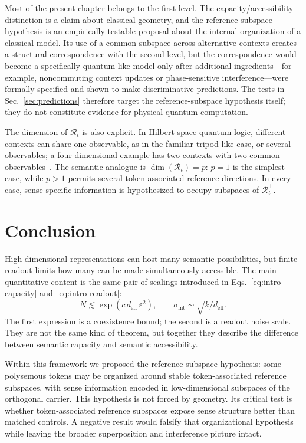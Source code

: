 \documentclass[
  aps,
  reprint,
  superscriptaddress,
  floatfix,
  nofootinbib,
  longbibliography
]{revtex4-2}
\newcommand{\deff}{d_{\mathrm{eff}}}
\newcommand{\sint}{\sigma_{\mathrm{int}}}
\begin{document}
Most of the present chapter belongs to the first level.  The
capacity/accessibility distinction is a claim about classical geometry, and
the reference-subspace hypothesis is an empirically testable proposal about
the internal organization of a classical model. Its use of a common
subspace across alternative contexts creates a structural correspondence with the second
level, but the correspondence would become a specifically quantum-like
model only after additional ingredients---for example, noncommuting context
updates or phase-sensitive interference---were formally specified and shown
to make discriminative predictions.  The tests in
Sec.~\ref{sec:predictions} therefore target the reference-subspace hypothesis itself; they
do not constitute evidence for physical quantum computation.

The dimension of $\mathcal R_t$ is also explicit. In Hilbert-space quantum
logic, different contexts can share one observable, as in the familiar
tripod-like case, or several observables; a four-dimensional example has
two contexts with two common observables~\cite{svozil:040102}. The semantic
analogue is $\dim(\mathcal R_t)=p$: $p=1$ is the simplest case, while
$p>1$ permits several token-associated reference directions. In every case,
sense-specific information is hypothesized to occupy subspaces of
$\mathcal R_t^\perp$.

\section{Conclusion}
\label{sec:conclusion}

High-dimensional representations can host many semantic possibilities,
but finite readout limits how many can be made simultaneously
accessible. The main quantitative content is the same pair of scalings
introduced in Eqs.~\eqref{eq:intro-capacity} and~\eqref{eq:intro-readout}:
%
\begin{equation}
\label{eq:summary}
N\lesssim\exp(c\,\deff\,\varepsilon^{2}),
\qquad
\sint\sim\sqrt{k/\deff}.
\end{equation}
%
The first expression is a coexistence bound; the second is a readout
noise scale. They are not the same kind of theorem, but together they
describe the difference between semantic capacity and semantic
accessibility.

Within this framework we proposed the reference-subspace hypothesis: some
polysemous tokens may be organized around stable token-associated
reference subspaces,
with sense information encoded in low-dimensional subspaces of the
orthogonal carrier. This hypothesis is not forced by geometry. Its
critical test is whether token-associated reference subspaces
expose sense structure better than matched controls. A negative result
would falsify that organizational hypothesis while leaving the broader superposition
and interference picture intact.
\end{document}

